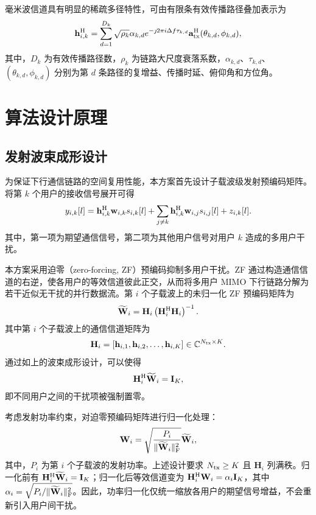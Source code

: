 \documentclass[onecolumn,10pt]{IEEEtran}
\begin{document}
毫米波信道具有明显的稀疏多径特性，可由有限条有效传播路径叠加表示为
\begin{align}
    \mathbf{h}_{i,k}^{\rm H}
    =
    \sum_{d=1}^{D_k}
    \sqrt{\rho_k}\alpha_{k,d}e^{-\jmath2\pi i\Delta f\tau_{k,d}}
    \mathbf{a}^{\rm H}_{\rm tx}(\theta_{k,d},\phi_{k,d}),
\end{align}
其中，$D_k$ 为有效传播路径数，$\rho_k$ 为链路大尺度衰落系数，$\alpha_{k,d}$、$\tau_{k,d}$、$(\theta_{k,d},\phi_{k,d})$ 分别为第 $d$ 条路径的复增益、传播时延、俯仰角和方位角。


\section{算法设计原理}

\subsection{发射波束成形设计}

为保证下行通信链路的空间复用性能，本方案首先设计子载波级发射预编码矩阵。将第 $k$ 个用户的接收信号展开可得
\begin{align}
    y_{i,k}[l]
    =
    \mathbf{h}_{i,k}^{\rm H}\mathbf{w}_{i,k}s_{i,k}[l]
    +
    \sum_{j\neq k}
    \mathbf{h}_{i,k}^{\rm H}\mathbf{w}_{i,j}s_{i,j}[l]
    +
    z_{i,k}[l].
\end{align}
其中，第一项为期望通信信号，第二项为其他用户信号对用户 $k$ 造成的多用户干扰。

本方案采用迫零（zero-forcing, ZF）预编码抑制多用户干扰。ZF 通过构造通信信道的右逆，使各用户的等效信道彼此正交，从而将多用户 MIMO 下行链路分解为若干近似无干扰的并行数据流。第 $i$ 个子载波上的未归一化 ZF 预编码矩阵为
\begin{align}
    \widetilde{\mathbf{W}}_i
    =
    \mathbf{H}_i
    \left(
    \mathbf{H}_i^{\rm H}\mathbf{H}_i
    \right)^{-1}.
\end{align}
其中第 $i$ 个子载波上的通信信道矩阵为
\begin{align}
    \mathbf{H}_i
    =
    \left[
    \mathbf{h}_{i,1},
    \mathbf{h}_{i,2},
    \ldots,
    \mathbf{h}_{i,K}
    \right]
    \in \mathbb{C}^{N_{\rm tx}\times K}.
\end{align}
 通过如上的波束成形设计，可以使得
\begin{align}
    \mathbf{H}_i^{\rm H}\widetilde{\mathbf{W}}_i
    =
    \mathbf{I}_K,
\end{align}
即不同用户之间的干扰项被强制置零。


考虑发射功率约束，对迫零预编码矩阵进行归一化处理：
\begin{align}
    \mathbf{W}_i
    =
    \sqrt{\frac{P_i}{\|\widetilde{\mathbf{W}}_i\|_{\rm F}^2}}
    \widetilde{\mathbf{W}}_i,
\end{align}
其中，$P_i$ 为第 $i$ 个子载波的发射功率。上述设计要求 $N_{\rm tx}\geq K$ 且 $\mathbf{H}_i$ 列满秩。归一化前有 $\mathbf{H}_i^{\rm H}\widetilde{\mathbf{W}}_i=\mathbf{I}_K$；归一化后等效信道变为 $\mathbf{H}_i^{\rm H}\mathbf{W}_i=\alpha_i\mathbf{I}_K$，其中 $\alpha_i=\sqrt{P_i/\|\widetilde{\mathbf{W}}_i\|_{\rm F}^{2}}$。因此，功率归一化仅统一缩放各用户的期望信号增益，不会重新引入用户间干扰。
\end{document}
